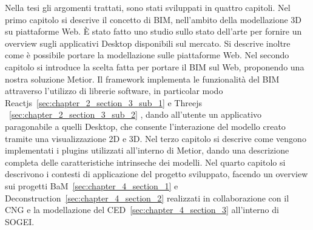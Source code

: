 Nella tesi gli argomenti trattati, sono stati sviluppati in quattro capitoli.
Nel primo capitolo si descrive il concetto di BIM,
nell'ambito della modellazione 3D su piattaforme Web. \`E stato fatto uno studio sullo stato dell'arte
per fornire un overview sugli applicativi Desktop disponibili sul mercato.
Si descrive inoltre come \`e possibile portare la modellazione sulle piattaforme Web.
Nel secondo capitolo si introduce la scelta fatta per portare il BIM sul Web, proponendo una nostra soluzione Metior.
Il framework implementa le funzionalit\`a del BIM attraverso l'utilizzo di librerie software,
in particolar modo Reactjs~\ref{sec:chapter_2_section_3_sub_1} e Threejs ~\ref{sec:chapter_2_section_3_sub_2} ,
dando all'utente un applicativo paragonabile a quelli
Desktop, che consente l'interazione del modello creato tramite una visualizzazione 2D e 3D.
Nel terzo capitolo si descrive come vengono implementati i plugins utilizzati all'interno di Metior,
dando una descrizione completa delle caratteristiche intrinseche dei modelli.
Nel quarto capitolo si descrivono i contesti di applicazione del progetto sviluppato,
facendo un overview sui progetti BaM~\ref{sec:chapter_4_section_1}
 e Deconstruction~\ref{sec:chapter_4_section_2} realizzati in collaborazione con il CNG
e la modellazione del CED~\ref{sec:chapter_4_section_3} all'interno di SOGEI.
